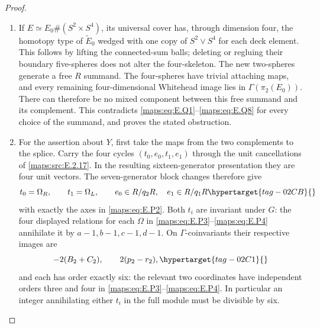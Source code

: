 \documentclass[11pt,a4paper]{article}
\numberwithin{equation}{section}
\theoremstyle{definition}
\begin{document}
\begin{proof}
\begin{enumerate}[label=\arabic*.,leftmargin=*]
\item If $E\simeq E_0\#(S^2\times S^4)$, its universal cover
has, through dimension four, the homotopy type of
$\widetilde E_0$ wedged with one copy of $S^2\vee S^4$
for each deck element.  This follows by lifting the
connected-sum balls; deleting or regluing their boundary
five-spheres does not alter the four-skeleton.  The new
two-spheres generate a free $R$ summand.  The four-spheres
have trivial attaching maps, and every remaining
four-dimensional Whitehead image lies in
$\Gamma(\pi_2(E_0))$.  There can therefore be no mixed
component between this free summand and its complement.
This contradicts \eqref{maps:eq:E.Q1}--\eqref{maps:eq:E.Q8} for every choice of the
summand, and proves the stated obstruction.

\item For the assertion about $Y$, first take the maps from the two complements to the splice.  Carry the four cycles $(t_0,e_0,t_1,e_1)$ through the unit
cancellations of \ref{maps:src:E.2.17}. In the resulting
sixteen-generator presentation they are four unit vectors.  The seven-generator block changes therefore give
\begin{equation}
 t_0=\Omega_R,\qquad t_1=\Omega_L,
 \qquad e_0\in R/q_2R,\quad e_1\in R/q_1R
 \hypertarget{tag-02CB}{}\label{maps:eq:E.Q9}
\end{equation}
with exactly the axes in \eqref{maps:eq:E.P2}.  
Both $t_i$ are invariant under $G$: the four displayed
relations for each $\Omega$ in \eqref{maps:eq:E.P3}--\eqref{maps:eq:E.P4} annihilate
it by $a-1,b-1,c-1,d-1$.  On $\Gamma$-coinvariants
their respective images are
\begin{equation}
 -2(B_2+C_2),\qquad 2(p_2-r_2),
 \hypertarget{tag-02C1}{}\label{maps:eq:E.Q10}
\end{equation}
and each has order exactly six: the relevant two coordinates
have independent orders three and four in \eqref{maps:eq:E.P3}--\eqref{maps:eq:E.P4}.
In particular an integer annihilating either $t_i$ in the
full module must be divisible by six.


\end{enumerate}
\end{proof}
\end{document}
